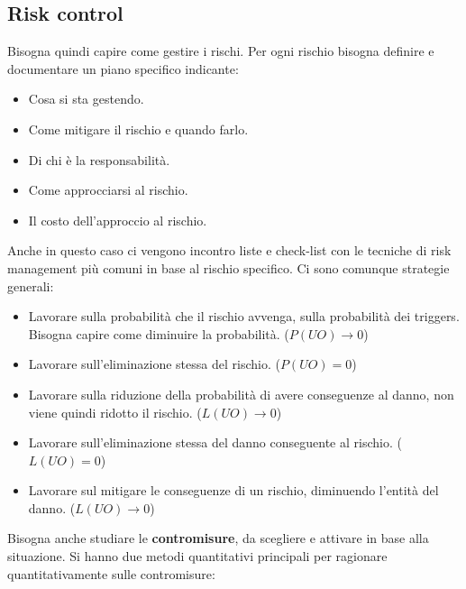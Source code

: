 \subsection{Risk control}
Bisogna quindi capire come gestire i rischi. Per ogni rischio bisogna definire e
documentare un piano specifico indicante:
\begin{itemize}
    \item Cosa si sta gestendo.
    \item Come mitigare il rischio e quando farlo.
    \item Di chi è la responsabilità.
    \item Come approcciarsi al rischio.
    \item Il costo dell'approccio al rischio.
\end{itemize}
Anche in questo caso ci vengono incontro liste e check-list con le tecniche di risk
management più comuni in base al rischio specifico. Ci sono comunque strategie generali:
\begin{itemize}
    \item Lavorare sulla probabilità che il rischio avvenga, sulla probabilità dei
          triggers. Bisogna capire come diminuire la probabilità. ($P(UO) \to 0$)
    \item Lavorare sull'eliminazione stessa del rischio. ($P(UO) = 0$)
    \item Lavorare sulla riduzione della probabilità di avere conseguenze al danno,
          non viene quindi ridotto il rischio. ($L(UO) \to 0$)
    \item Lavorare sull'eliminazione stessa del danno conseguente al rischio. ($L(UO) = 0$)
    \item Lavorare sul mitigare le conseguenze di un rischio, diminuendo l'entità
          del danno. ($L(UO) \to 0$)
\end{itemize}
Bisogna anche studiare le \textbf{contromisure}, da scegliere e attivare in base
alla situazione. Si hanno due metodi quantitativi principali per ragionare
quantitativamente sulle contromisure:

